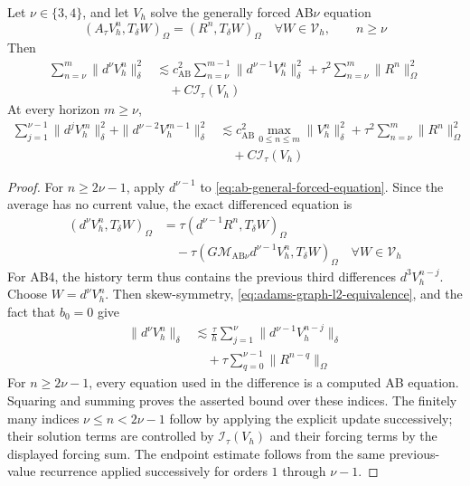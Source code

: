 \documentclass[11pt]{article}
\begin{document}
\begin{lem}
\label{lem:ab-increment-control}
Let \(\nu\in\{3,4\}\), and let \(V_h\) solve the generally forced AB\(\nu\)
equation
\begin{equation}
(A_{\tau}V_h^n,T_{\delta}W)_{\Omega}
=(R^n,T_{\delta}W)_{\Omega}
\quad\forall W\in\mathcal V_h,\qquad n\ge \nu
\label{eq:ab-general-forced-equation}
\end{equation}
Then
\begin{align}
\sum_{n=\nu}^{m}\|d^{\nu}V_h^n\|_{\delta}^2
&\lesssim c_{\mathrm{AB}}^2
\sum_{n=\nu}^{m-1}\|d^{\nu-1}V_h^n\|_{\delta}^2
+\tau^2\sum_{n=\nu}^{m}\|R^n\|_{\Omega}^2
\label{eq:ab-high-increment-control-solution}\\
&\quad+C\mathcal I_{\tau}(V_h)
\label{eq:ab-high-increment-control-startup}
\end{align}
At every horizon \(m\ge \nu\),
\begin{align}
\sum_{j=1}^{\nu-1}\|d^jV_h^m\|_{\delta}^2
+\|d^{\nu-2}V_h^{m-1}\|_{\delta}^2
&\lesssim c_{\mathrm{AB}}^2
\max_{0\le n\le m}\|V_h^n\|_{\delta}^2
+\tau^2\sum_{n=\nu}^{m}\|R^n\|_{\Omega}^2
\label{eq:ab-endpoint-increment-control-solution}\\
&\quad+C\mathcal I_{\tau}(V_h)
\label{eq:ab-endpoint-increment-control-startup}
\end{align}
\end{lem}
\begin{proof}
For \(n\ge2\nu-1\), apply \(d^{\nu-1}\) to
\eqref{eq:ab-general-forced-equation}. Since the average has no current
value, the exact differenced equation is
\begin{align}
(d^{\nu}V_h^n,T_{\delta}W)_{\Omega}
&=\tau(d^{\nu-1}R^n,T_{\delta}W)_{\Omega}
\label{eq:ab-differenced-equation-forcing}\\
&\quad-\tau(G\mathcal M_{\mathrm{AB}\nu}d^{\nu-1}V_h^n,
T_{\delta}W)_{\Omega}\quad \forall W\in\mathcal V_h
\label{eq:ab-differenced-equation-solution}
\end{align}
For AB4, the history term thus contains the previous third differences
\(d^3V_h^{n-j}\). Choose \(W=d^{\nu}V_h^n\). Then
skew-symmetry, \eqref{eq:adams-graph-l2-equivalence}, and the fact that
\(b_0=0\) give
\begin{align}
\|d^{\nu}V_h^n\|_{\delta}
&\lesssim\frac{\tau}{h}\sum_{j=1}^{\nu}
\|d^{\nu-1}V_h^{n-j}\|_{\delta} \label{eq:ab-pointwise-increment-solution}\\
&\quad+\tau\sum_{q=0}^{\nu-1}
\|R^{n-q}\|_{\Omega}
\label{eq:ab-pointwise-increment-forcing}
\end{align}
For \(n\ge2\nu-1\), every equation used in the difference is a computed AB
equation. Squaring and summing proves the asserted bound over these indices.
The finitely many indices \(\nu\le n<2\nu-1\) follow by applying the explicit
update successively; their solution terms are controlled by
\(\mathcal I_{\tau}(V_h)\) and their forcing terms by the displayed forcing
sum. The endpoint estimate follows from the same previous-value recurrence
applied successively for orders \(1\) through \(\nu-1\).
\end{proof}
\end{document}
